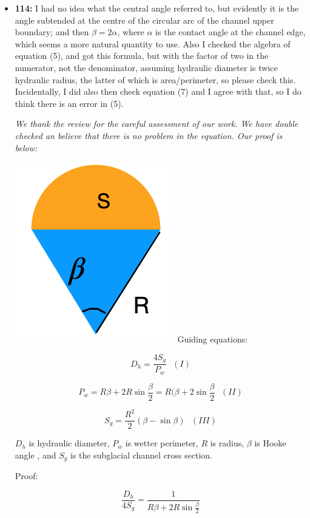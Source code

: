 \documentclass[11pt]{article}
\begin{document}
\begin{itemize}
\item \textbf{114:} I had no idea what the central angle referred to, but evidently it is the angle subtended at the centre of the circular arc of the channel upper boundary; and then $\beta = 2\alpha$, where $\alpha$ is the contact angle at the channel edge, which seems a more natural quantity to use. Also I checked the algebra of equation (5), and got this formula, but with the factor of two in the numerator, not the denominator, assuming hydraulic diameter is twice hydraulic radius, the latter of which is area/perimeter, so please check this. Incidentally, I did also then check equation (7) and I agree with that, so I do think there is an error in (5).

  \textit{We thank the review for the careful assessment of our work. We have double checked an believe that there is no problem in the equation. Our proof is below:}

   \includegraphics[width=0.3\linewidth]{Hooke.png}
  Guiding equations:

  \begin{equation}
    D_h = \frac{4S_g}{P_w}~~~(I)
  \end{equation}

  \begin{equation}
    P_w = R \beta +2R \sin\frac{\beta}{2}= R(\beta +2\sin \frac{\beta}{2} ~~~(II)
  \end{equation}

  \begin{equation}
    S_g=\frac{R^2}{2}(\beta - \sin \beta)~~~(III)
  \end{equation}

  $D_h$ is hydraulic diameter, $P_w$ is wetter perimeter, $R$ is radius, $\beta$ is Hooke angle \citep{hooke1990}, and $S_g$ is the subglacial channel cross section.

  Proof:
  
  \begin{linenomath*}
    \begin{equation}
      \frac{D_h}{4S_g} = \frac{1}{R\beta + 2R\sin\frac{\beta}{2}}
    \end{equation}
  \end{linenomath*}


\end{itemize}
\end{document}
